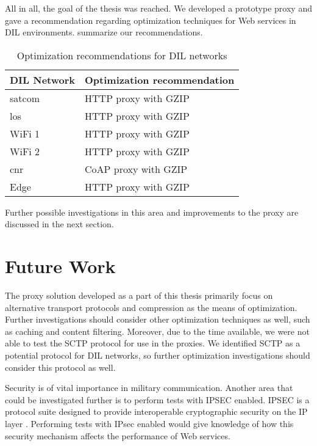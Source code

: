 All in all, the goal of the thesis was reached. We developed a prototype proxy
and gave a recommendation regarding optimization techniques for Web services in
DIL environments.  summarize our
recommendations.

\begin{table}[h]
\begin{tabularx}{\textwidth}{| l | X |}
    \hline
  \textbf{DIL Network} & \textbf{Optimization recommendation} \\ \hline
  \gls{satcom} & HTTP proxy with GZIP \\ \hline
  \gls{los} & HTTP proxy with GZIP  \\ \hline
  WiFi 1 & HTTP proxy with GZIP  \\ \hline
  WiFi 2 & HTTP proxy with GZIP  \\ \hline
  \gls{cnr} & CoAP proxy with GZIP  \\ \hline
  Edge & HTTP proxy with GZIP \\ \hline
\end{tabularx}
\caption{Optimization recommendations for DIL networks}
\label{table:conclusion-recommendations}
\end{table}

Further possible investigations in this area and improvements
to the proxy are discussed in the next section.


\section{Future Work}

The proxy solution developed as a part of this thesis primarily focus on
alternative transport protocols and compression as the means of optimization.
Further investigations should consider other optimization techniques as well,
such as caching and content filtering. Moreover, due to the time available, we
were not able to test the SCTP protocol for use in the proxies. We identified
SCTP as a potential protocol for DIL networks, so further optimization
investigations should consider this protocol as well.

Security is of vital importance in military communication. Another area that
could be investigated further is to perform tests with IPSEC enabled. IPSEC is
a protocol suite designed to provide interoperable cryptographic security on the
IP layer \cite{kent1998}. Performing tests with IPsec enabled would give knowledge of how this
security mechanism affects the performance of Web services.

